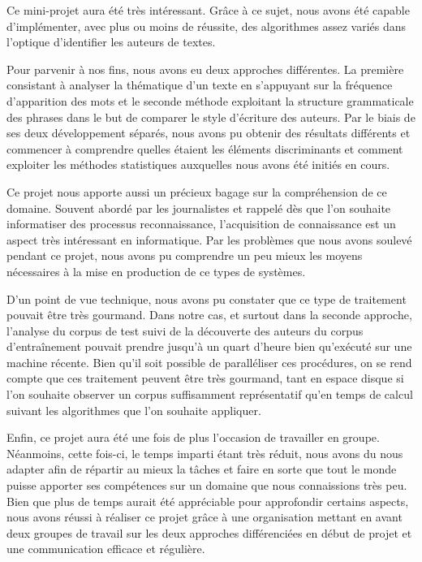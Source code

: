 \documentclass[a4paper,12pt]{report}
\begin{document}
Ce mini-projet aura été très intéressant. Grâce à ce sujet, nous avons été capable d'implémenter, avec plus ou moins de réussite, des algorithmes assez variés dans l'optique d'identifier les auteurs de textes.

Pour parvenir à nos fins, nous avons eu deux approches différentes. La première consistant à analyser la thématique d'un texte en s'appuyant sur la fréquence d'apparition des mots et le seconde méthode exploitant la structure grammaticale des phrases dans le but de comparer le style d'écriture des auteurs. Par le biais de ses deux développement séparés, nous avons pu obtenir des résultats différents et commencer à comprendre quelles étaient les éléments discriminants et comment exploiter les méthodes statistiques auxquelles nous avons été initiés en cours.

Ce projet nous apporte aussi un précieux bagage sur la compréhension de ce domaine. Souvent abordé par les journalistes et rappelé dès que l'on souhaite informatiser des processus reconnaissance, l'acquisition de connaissance est un aspect très intéressant en informatique. Par les problèmes que nous avons soulevé pendant ce projet, nous avons pu comprendre un peu mieux les moyens nécessaires à la mise en production de ce types de systèmes.

D'un point de vue technique, nous avons pu constater que ce type de traitement pouvait être très gourmand. Dans notre cas, et surtout dans la seconde approche, l'analyse du corpus de test suivi de la découverte des auteurs du corpus d'entraînement pouvait prendre jusqu'à un quart d'heure bien qu'exécuté sur une machine récente. Bien qu'il soit possible de paralléliser ces procédures, on se rend compte que ces traitement peuvent être très gourmand, tant en espace disque si l'on souhaite observer un corpus suffisamment représentatif qu'en temps de calcul suivant les algorithmes que l'on souhaite appliquer.

Enfin, ce projet aura été une fois de plus l'occasion de travailler en groupe. Néanmoins, cette fois-ci, le temps imparti étant très réduit, nous avons du nous adapter afin de répartir au mieux la tâches et faire en sorte que tout le monde puisse apporter ses compétences sur un domaine que nous connaissions très peu. Bien que plus de temps aurait été appréciable pour approfondir certains aspects, nous avons réussi à réaliser ce projet grâce à une organisation mettant en avant deux groupes de travail sur les deux approches différenciées en début de projet et une communication efficace et régulière.
\end{document}
